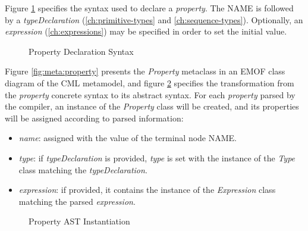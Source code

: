 Figure \ref{fig:stx:property} specifies the syntax used
to declare a \emph{property}.
The NAME is followed by a \emph{typeDeclaration}
(\ref{ch:primitive-types} and \ref{ch:sequence-types}).
Optionally, an \emph{expression} (\ref{ch:expressions}) may be specified
in order to set the initial value.

\begin{figure}
\verbatimfont{\small}

\caption{Property Declaration Syntax}
\label{fig:stx:property}
\end{figure}

Figure \ref{fig:meta:property} presents the \emph{Property} metaclass
in an EMOF \cite{mof} class diagram of the CML metamodel,
and figure \ref{fig:ast:property} specifies
the transformation
from the \emph{property} concrete syntax to its abstract syntax.
For each \emph{property} parsed by the compiler,
an instance of the \emph{Property} class will be created,
and its properties will be assigned
according to parsed information:

\begin{itemize}

\item \emph{name}:
assigned with the value of the terminal node NAME.

\item \emph{type}:
if \emph{typeDeclaration} is provided,
\emph{type} is set with the instance of the \emph{Type} class
matching the \emph{typeDeclaration}.

\item \emph{expression}:
if provided,
it contains the instance of the \emph{Expression} class
matching the parsed \emph{expression}.

\end{itemize}

\begin{figure}
\verbatimfont{\small}

\caption{Property AST Instantiation}
\label{fig:ast:property}
\end{figure}
